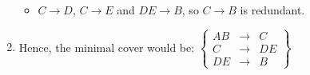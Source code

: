 \documentclass[11pt,letterpaper,titlepage,en-US]{article}
\begin{document}
\begin{homeworkProblem}
\begin{enumerate}[label=\textbf{Step {\arabic*}}, leftmargin=2cm]
\begin{itemize}
                \item $C \rightarrow D$, $C \rightarrow E$ and $DE \rightarrow B$, so $C \rightarrow B$ is redundant.
            \end{itemize}
        \item Hence, the minimal cover would be:
            $\displaystyle\left\{
                    \begin{array}{rcl}
                        AB &\rightarrow& C \\
                        C &\rightarrow& DE \\
                        DE &\rightarrow& B
                    \end{array}
            \right\}$
    \end{enumerate}
\end{homeworkProblem}
\pagebreak
\end{document}
